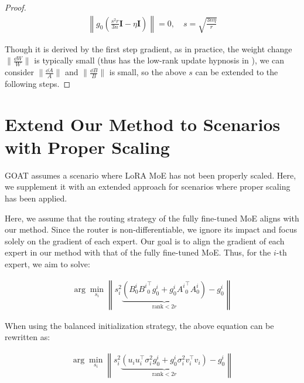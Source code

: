 \begin{proof}
\vspace{-5pt}
\begin{align}
    \left\| g_0 \left( \frac{s^2r}{3n} \mathbf{I} - \eta \mathbf{I} \right) \right\| = 0 ,\quad s = \sqrt{\frac{ 3n\eta}{r}}
\end{align}

Though it is derived by the first step gradient, as in practice, the weight change $\|\frac{\dd W}{W}\|$ is typically small (thus has the low-rank update hypnosis in \citet{hulora}), we can consider $\|\frac{\dd A}{A}\|$ and $\|\frac{\dd B}{B}\|$ is small, so the above \(s\) can be extended to the following steps. 

\end{proof}

\section{Extend Our Method to Scenarios with Proper Scaling}\label{app:goat_pro}
GOAT assumes a scenario where LoRA MoE has not been properly scaled. Here, we supplement it with an extended approach for scenarios where proper scaling has been applied.



Here, we assume that the routing strategy of the fully fine-tuned MoE aligns with our method. Since the router is non-differentiable, we ignore its impact and focus solely on the gradient of each expert. Our goal is to align the gradient of each expert in our method with that of the fully fine-tuned MoE. Thus, for the \(i\)-th expert, we aim to solve:

\begin{align}
\arg\min_{s_i} \left\| s_i^2 \underbrace{\left( B^i_0 {B^i}^\top_0 g^i_0 + g^i_0 {A^i}^\top_0 A^i_0 \right)}_{\text{rank} < 2r} - g^i_0 \right\|
\end{align}

When using the balanced initialization strategy, the above equation can be rewritten as:

\begin{align}
\arg\min_{s_i} \left\| s_i^2 \underbrace{\left( u_i u_i^\top \sigma_i^2 g^i_0 + g^i_0 \sigma_i^2 v_i^\top v_i \right)}_{\text{rank} < 2r} - g^i_0 \right\|
\end{align}

